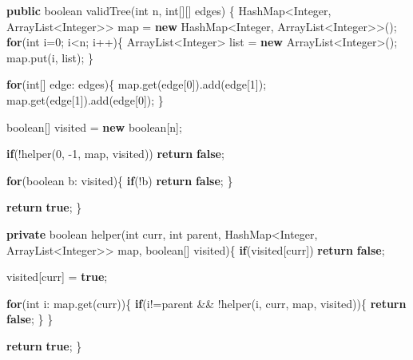 \documentclass[]{book}
\newenvironment{Shaded}{\begin{snugshade}}{\end{snugshade}}
\newcommand{\BuiltInTok}[1]{#1}
\newcommand{\DataTypeTok}[1]{\textcolor[rgb]{0.13,0.29,0.53}{#1}}
\newcommand{\DecValTok}[1]{\textcolor[rgb]{0.00,0.00,0.81}{#1}}
\newcommand{\FunctionTok}[1]{\textcolor[rgb]{0.00,0.00,0.00}{#1}}
\newcommand{\KeywordTok}[1]{\textcolor[rgb]{0.13,0.29,0.53}{\textbf{#1}}}
\newcommand{\NormalTok}[1]{#1}
\begin{document}
\begin{Shaded}
\begin{Highlighting}[]
\KeywordTok{public} \DataTypeTok{boolean} \FunctionTok{validTree}\NormalTok{(}\DataTypeTok{int}\NormalTok{ n, }\DataTypeTok{int}\NormalTok{[][] edges) \{}
    \BuiltInTok{HashMap}\NormalTok{<}\BuiltInTok{Integer}\NormalTok{, }\BuiltInTok{ArrayList}\NormalTok{<}\BuiltInTok{Integer}\NormalTok{>> map = }\KeywordTok{new} \BuiltInTok{HashMap}\NormalTok{<}\BuiltInTok{Integer}\NormalTok{, }\BuiltInTok{ArrayList}\NormalTok{<}\BuiltInTok{Integer}\NormalTok{>>();}
    \KeywordTok{for}\NormalTok{(}\DataTypeTok{int}\NormalTok{ i=}\DecValTok{0}\NormalTok{; i<n; i++)\{}
        \BuiltInTok{ArrayList}\NormalTok{<}\BuiltInTok{Integer}\NormalTok{> list = }\KeywordTok{new} \BuiltInTok{ArrayList}\NormalTok{<}\BuiltInTok{Integer}\NormalTok{>();}
\NormalTok{        map.}\FunctionTok{put}\NormalTok{(i, list);}
\NormalTok{    \}}

    \KeywordTok{for}\NormalTok{(}\DataTypeTok{int}\NormalTok{[] edge: edges)\{}
\NormalTok{        map.}\FunctionTok{get}\NormalTok{(edge[}\DecValTok{0}\NormalTok{]).}\FunctionTok{add}\NormalTok{(edge[}\DecValTok{1}\NormalTok{]);}
\NormalTok{        map.}\FunctionTok{get}\NormalTok{(edge[}\DecValTok{1}\NormalTok{]).}\FunctionTok{add}\NormalTok{(edge[}\DecValTok{0}\NormalTok{]);}
\NormalTok{    \}}

    \DataTypeTok{boolean}\NormalTok{[] visited = }\KeywordTok{new} \DataTypeTok{boolean}\NormalTok{[n];}

    \KeywordTok{if}\NormalTok{(!}\FunctionTok{helper}\NormalTok{(}\DecValTok{0}\NormalTok{, }\DecValTok{-1}\NormalTok{, map, visited))}
        \KeywordTok{return} \KeywordTok{false}\NormalTok{;}

    \KeywordTok{for}\NormalTok{(}\DataTypeTok{boolean}\NormalTok{ b: visited)\{}
        \KeywordTok{if}\NormalTok{(!b)}
            \KeywordTok{return} \KeywordTok{false}\NormalTok{;}
\NormalTok{    \}}

    \KeywordTok{return} \KeywordTok{true}\NormalTok{;}
\NormalTok{\}}

\KeywordTok{private} \DataTypeTok{boolean} \FunctionTok{helper}\NormalTok{(}\DataTypeTok{int}\NormalTok{ curr, }\DataTypeTok{int}\NormalTok{ parent,}
    \BuiltInTok{HashMap}\NormalTok{<}\BuiltInTok{Integer}\NormalTok{, }\BuiltInTok{ArrayList}\NormalTok{<}\BuiltInTok{Integer}\NormalTok{>> map, }\DataTypeTok{boolean}\NormalTok{[] visited)\{}
    \KeywordTok{if}\NormalTok{(visited[curr])}
        \KeywordTok{return} \KeywordTok{false}\NormalTok{;}

\NormalTok{    visited[curr] = }\KeywordTok{true}\NormalTok{;}

    \KeywordTok{for}\NormalTok{(}\DataTypeTok{int}\NormalTok{ i: map.}\FunctionTok{get}\NormalTok{(curr))\{}
        \KeywordTok{if}\NormalTok{(i!=parent && !}\FunctionTok{helper}\NormalTok{(i, curr, map, visited))\{}
            \KeywordTok{return} \KeywordTok{false}\NormalTok{;}
\NormalTok{        \}}
\NormalTok{    \}}

    \KeywordTok{return} \KeywordTok{true}\NormalTok{;}
\NormalTok{\}}
\end{Highlighting}
\end{Shaded}
\end{document}
